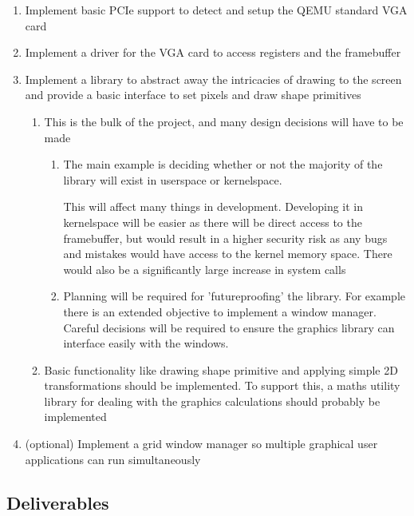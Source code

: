 \begin{enumerate}
    \item{Implement basic PCIe support to detect and setup the QEMU standard VGA card}
    \item{Implement a driver for the VGA card to access registers and the framebuffer}
    \item{Implement a library to abstract away the intricacies of drawing to the screen and provide a basic interface to set pixels and draw shape primitives}
          \begin{enumerate}
              \item This is the bulk of the project, and many design decisions will have to be made
                    \begin{enumerate}
                        \item The main example is deciding whether or not the majority of the library will exist in userspace or kernelspace.

                              This will affect many things in development. Developing it in kernelspace will be easier as
                              there will be direct access to the framebuffer, but would result in a higher security risk
                              as any bugs and mistakes would have access to the kernel memory space. There would also be a
                              significantly large increase in system calls
                        \item Planning will be required for 'futureproofing' the library. For example there is an extended objective
                              to implement a window manager. Careful decisions will be required to ensure the graphics library can
                              interface easily with the windows.
                    \end{enumerate}
              \item Basic functionality like drawing shape primitive and applying simple 2D transformations
                    should be implemented. To support this, a maths utility library for dealing with the
                    graphics calculations should probably be implemented
          \end{enumerate}
    \item{(optional) Implement a grid window manager so multiple graphical user applications can run simultaneously}
\end{enumerate}

\subsection{Deliverables}

